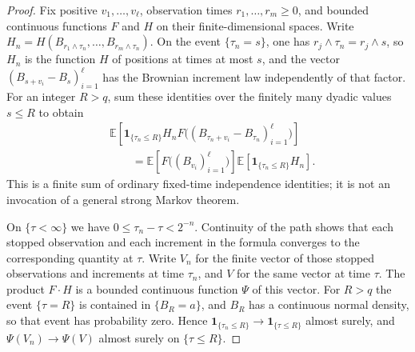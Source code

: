 \begin{proof}
Fix positive $v_1,\ldots,v_\ell$, observation times $r_1,\ldots,r_m\ge0$, and bounded continuous functions $F$ and $H$ on their finite-dimensional spaces. Write $H_n=H(B_{r_1\wedge\tau_n},\ldots,B_{r_m\wedge\tau_n})$. On the event $\{\tau_n=s\}$, one has $r_j\wedge\tau_n=r_j\wedge s$, so $H_n$ is the function $H$ of positions at times at most $s$, and the vector
$(B_{s+v_i}-B_s)_{i=1}^\ell$ has the Brownian increment law independently of that factor. For an integer $R>q$, sum these identities over the finitely many dyadic values $s\le R$ to obtain
\[
\begin{aligned}
&\mathbb E\!\left[\mathbf1_{\{\tau_n\le R\}}H_n
 F\bigl((B_{\tau_n+v_i}-B_{\tau_n})_{i=1}^\ell\bigr)\right]\\
&\hspace{2em}=
\mathbb E\!\left[F\bigl((B_{v_i})_{i=1}^\ell\bigr)\right]
\mathbb E[\mathbf1_{\{\tau_n\le R\}}H_n].
\end{aligned}
\]
This is a finite sum of ordinary fixed-time independence identities; it is not an invocation of a general strong Markov theorem.

On $\{\tau<\infty\}$ we have $0\le\tau_n-\tau<2^{-n}$. Continuity of the path shows that each stopped observation and each increment in the formula converges to the corresponding quantity at $\tau$. Write $V_n$ for the finite vector of those stopped observations and increments at time $\tau_n$, and $V$ for the same vector at time $\tau$. The product $F\cdot H$ is a bounded continuous function $\Psi$ of this vector. For $R>q$ the event $\{\tau=R\}$ is contained in $\{B_R=a\}$, and $B_R$ has a continuous normal density, so that event has probability zero. Hence $\mathbf1_{\{\tau_n\le R\}}\to\mathbf1_{\{\tau\le R\}}$ almost surely, and $\Psi(V_n)\to\Psi(V)$ almost surely on $\{\tau\le R\}$.


\end{proof}
